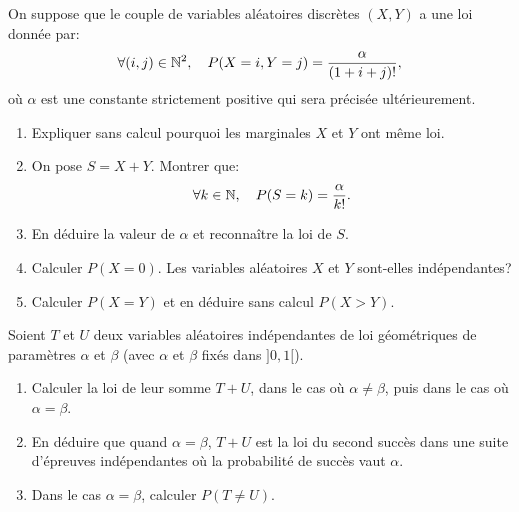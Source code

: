 \documentclass[a4paper,11pt,reqno]{amsart}
\begin{document}
\begin{exo}

  On suppose que le couple de variables aléatoires discrètes $(X,Y)$ a une loi donnée par:
    $$
      \forall (i,j)\in\mathbb{N}^{2},\quad P(X=i, Y=j)=\frac{\alpha}{(1+i+j)!},
    $$
  où $\alpha$ est une constante strictement positive qui sera précisée ultérieurement.
  \begin{enumerate}
    \item Expliquer sans  calcul pourquoi les marginales $X$ et $Y$ ont même loi.
    \item On pose $S=X+Y$. Montrer que:
      $$
        \forall k\in\mathbb{N},\quad P(S=k)=\frac{\alpha}{k!}.
      $$
    \item En déduire la valeur de $\alpha$ et reconnaître la loi de $S$.
    \item Calculer $P(X=0)$. Les variables aléatoires $X$ et $Y$ sont-elles indépendantes?
    \item Calculer $P(X=Y)$ et en déduire sans calcul $P(X>Y)$.
  \end{enumerate}

\end{exo}

\begin{exo}

  Soient $T$ et $U$  deux variables aléatoires indépendantes de loi géométriques de paramètres $\alpha$ et $\beta$ (avec $\alpha$ et $\beta$ fixés dans $]0,1[$).
  \begin{enumerate}
    \item Calculer la loi de leur somme $T+U$, dans le cas où $\alpha\neq\beta$, puis dans le cas où $\alpha=\beta$.
    \item En déduire que quand $\alpha=\beta$, $T+U$ est la loi du second succès dans une suite d'épreuves indépendantes où la probabilité de succès vaut $\alpha$.
    \item Dans le cas $\alpha=\beta$, calculer $P(T \neq U)$.
  \end{enumerate}

\end{exo}
\end{document}
